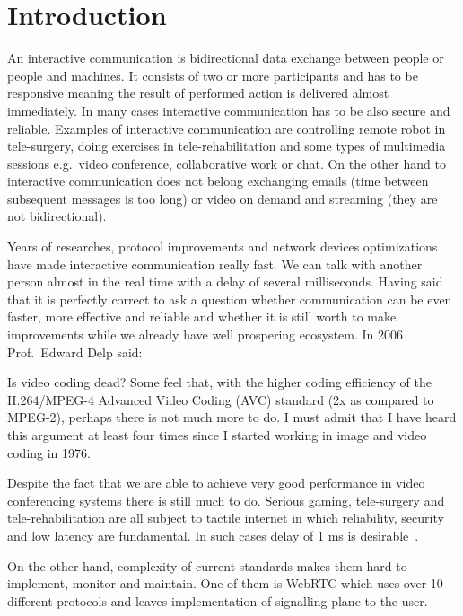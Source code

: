 \chapter{Introduction}
\label{ch:introduction}

An interactive communication is bidirectional data exchange between people or people and machines.
It consists of two or more participants and has to be responsive meaning the result of performed action is delivered almost immediately.
In many cases interactive communication has to be also secure and reliable.
Examples of interactive communication are controlling remote robot in tele-surgery, doing exercises in tele-rehabilitation and
some types of multimedia sessions e.g.\ video conference, collaborative work or chat.
On the other hand to interactive communication does not belong exchanging emails (time between subsequent messages is too long) or
video on demand and streaming (they are not bidirectional).

Years of researches, protocol improvements and network devices optimizations have made interactive communication really fast.
We can talk with another person almost in the real time with a delay of several milliseconds.
Having said that it is perfectly correct to ask a question whether communication can be even faster, more effective and reliable and whether it is still worth to make improvements while we already have well prospering ecosystem.
In 2006 Prof.\ Edward Delp said:
\begin{displayquote}
    Is video coding dead?
    Some feel that, with the higher coding efficiency of the H.264/MPEG-4 Advanced Video Coding (AVC) standard (2x as compared to MPEG-2), perhaps there is not much more to do.
    I must admit that I have heard this  argument at least four times since I started working in image and video coding in 1976.\cite{4015574}
\end{displayquote}
Despite the fact that we are able to achieve very good performance in video conferencing systems there is still much to do.
Serious gaming, tele-surgery and tele-rehabilitation are all subject to tactile internet in which reliability, security and low latency are fundamental.
In such cases delay of 1 ms is desirable~\cite{the-tactile-internet}.

On the other hand, complexity of current standards makes them hard to implement, monitor and maintain.
One of them is WebRTC which uses over 10 different protocols and leaves implementation of signalling plane to the user.

